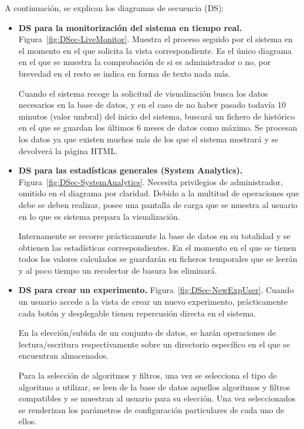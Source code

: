 A continuación, se explican los diagramas de secuencia (DS):
\begin{itemize}
\item \textbf{DS para la monitorización del sistema en tiempo real.} Figura~\ref{fig:DSec-LiveMonitor}. Muestra el proceso seguido por el sistema en el momento en el que solicita la vista correspondiente. Es el único diagrama en el que se muestra la comprobación de si es administrador o no, por brevedad en el resto se indica en forma de texto nada más. 

Cuando el sistema recoge la solicitud de visualización busca los datos necesarios en la base de datos, y en el caso de no haber pasado todavía 10 minutos (valor umbral) del inicio del sistema, buscará un fichero de histórico en el que se guardan los últimos 6 meses de datos como máximo. Se procesan los datos ya que existen muchos más de los que el sistema mostrará y se devolverá la página HTML.

\item \textbf{DS para las estadísticas generales (System Analytics).} Figura~\ref{fig:DSec-SystemAnalytics}. Necesita privilegios de administrador, omitido en el diagrama por claridad. Debido a la multitud de operaciones que debe se deben realizar, posee una pantalla de carga que se muestra al usuario en lo que es sistema prepara la visualización. 

Internamente se recorre prácticamente la base de datos en su totalidad y se obtienen las estadísticas correspondientes. En el momento en el que se tienen todos los valores calculados se guardarán en ficheros temporales que se leerán y al poco tiempo un recolector de basura los eliminará.

\item \textbf{DS para crear un experimento.} Figura~\ref{fig:DSec-NewExpUser}. Cuando un usuario accede a la vista de crear un nuevo experimento, prácticamente cada botón y desplegable tienen repercusión directa en el sistema. 

En la elección/subida de un conjunto de datos, se harán operaciones de lectura/escritura respectivamente sobre un directorio específico en el que se encuentran almacenados. 

Para la selección de algoritmos y filtros, una vez se selecciona el tipo de algoritmo a utilizar, se leen de la base de datos aquellos algoritmos y filtros compatibles y se muestran al usuario para su elección. Una vez seleccionados se renderizan los parámetros de configuración particulares de cada uno de ellos.


\end{itemize}

